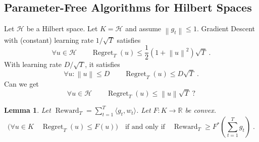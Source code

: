 \documentclass[largefonts,landscape]{sciposter}
\newtheorem*{lemma}{Lemma}
\DeclareMathOperator{\Regret}{Regret}
\DeclareMathOperator{\Reward}{Reward}
\newcommand{\R}{\mathbb{R}}
\renewcommand{\H}{\mathcal{H}}
\newcommand{\norm}[1]{\left\|#1\right\|}
\newcommand{\KL}[2]{\mathrm{KL}\left({#1} \, \middle\| \, {#2}\right)}
\newcommand{\Breg}{\mathcal{B}}
\begin{document}
\begin{multicols}{3}
% 
% 
% 
% 
% 
% 
% 
% 
% 

\section*{Parameter-Free Algorithms for Hilbert Spaces}

Let $\H$ be a Hilbert space. Let $K=\H$ and assume $\norm{g_t} \le 1$.
Gradient Descent with (constant) learning rate $1/\sqrt{T}$ satisfies
$$
\forall u \in \H \qquad \Regret_T(u) \le \frac{1}{2}\left(1 + \norm{u}^2\right) \sqrt{T} \; .
$$
With learning rate $D/\sqrt{T}$, it satisfies
$$
\forall u : \norm{u} \le D  \qquad \Regret_T(u) \le D \sqrt{T} \; .
$$
Can we get
$$
\forall u \in \H \qquad \Regret_T(u) \le \norm{u} \sqrt{T} \; ?
$$

\vspace{1cm}

\begin{lemma}
Let $\Reward_T = \sum_{t=1}^T \langle g_t, w_t \rangle$.
Let $F:K \to \R$ be convex.
$$
\big( \forall u \in K \quad \Regret_T(u) \le F(u) \big)
\quad \text{if and only if} \quad
\Reward_T \ge F^*\left(\sum_{t=1}^T g_t\right) \; .
$$
\end{lemma}


\end{multicols}
\end{document}

